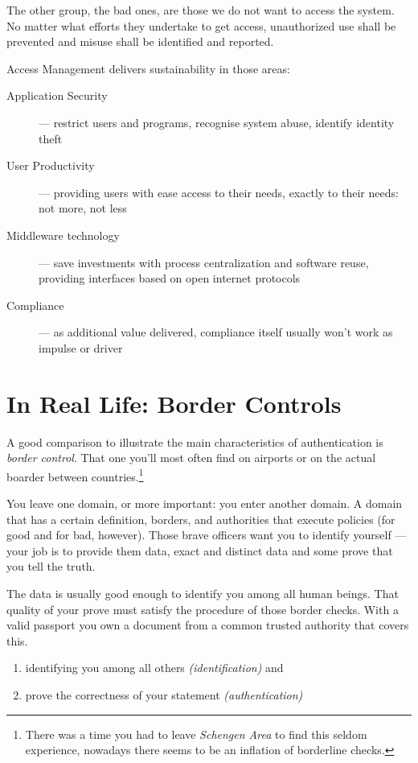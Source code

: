 \documentclass[11pt]{report}
\begin{document}
The other group, the bad ones, are those we do not want to access the
system. No matter what efforts they undertake to get access,
unauthorized use shall be prevented and misuse shall be identified and
reported.

Access Management delivers sustainability in those areas:

\begin{description}
    \item[Application Security] --- restrict users and programs, recognise
        system abuse, identify identity theft
    \item[User Productivity] --- providing users with ease access to their
        needs, exactly to their needs: not more, not less
    \item[Middleware technology] --- save investments with process
        centralization and software reuse, providing interfaces based
        on open internet protocols
    \item[Compliance] --- as additional value delivered, compliance itself
        usually won't work as impulse or driver
\end{description}




\section{In Real Life: Border Controls}

A good comparison to illustrate the main characteristics of
authentication is \emph{border control}. That one you'll most often find
on airports or on the actual boarder between countries.\footnote{There
    was a time you had to leave \emph{Schengen Area} to find this seldom
experience, nowadays there seems to be an inflation of borderline
checks.}

You leave one domain, or more important: you enter another domain. 
A domain that has a certain definition, borders, and authorities that 
execute policies (for good and for bad, however).  Those brave officers 
want you to identify yourself --- your job is to provide them data, exact 
and distinct data and some prove that you tell the truth.

The data is usually good enough to identify you among all human beings.
That quality of your prove must satisfy the procedure of those border
checks. With a valid passport you own a document from a common trusted
authority that covers this.

\begin{enumerate}
    \item identifying you among all others \emph{(identification)} and
    \item prove the correctness of your statement
        \emph{(authentication)}
\end{enumerate}
\end{document}
